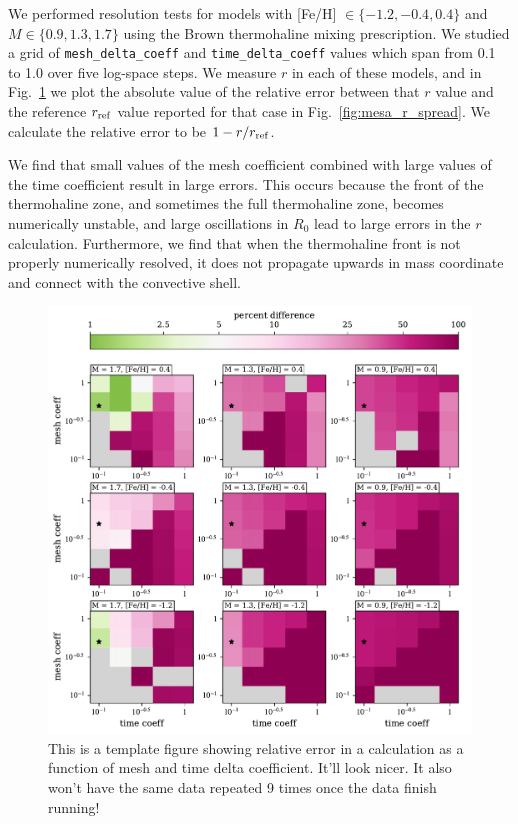 We performed resolution tests for models with [Fe/H] $\in \{-1.2, -0.4, 0.4\}$ and $M \in \{0.9, 1.3, 1.7\}$ using the Brown thermohaline mixing prescription.
We studied a grid of \texttt{mesh\_delta\_coeff} and \texttt{time\_delta\_coeff} values which span from 0.1 to 1.0 over five log-space steps.
We measure $r$ in each of these models, and in Fig.~\ref{Fig:resolution_test} we plot the absolute value of the relative error between that $r$ value and the reference $r_{\rm ref}$ value reported for that case in Fig.~\ref{fig:mesa_r_spread}.
We calculate the relative error to be $1 - r/r_{\rm{ref}}$.

We find that small values of the mesh coefficient combined with large values of the time coefficient result in large errors.
This occurs because the front of the thermohaline zone, and sometimes the full thermohaline zone, becomes numerically unstable, and large oscillations in $R_0$ lead to large errors in the $r$ calculation.
Furthermore, we find that when the thermohaline front is not properly numerically resolved, it does not propagate upwards in mass coordinate and connect with the convective shell.


\begin{figure}[!tb]
\begin{center}
\includegraphics[width=\textwidth]{./figures/resolution_test/resolution_test.pdf}
\caption{This is a template figure showing relative error in a calculation as a function of mesh and time delta coefficient. It'll look nicer. It also won't have the same data repeated 9 times once the data finish running!}
\label{Fig:resolution_test}
\end{center}
\end{figure}